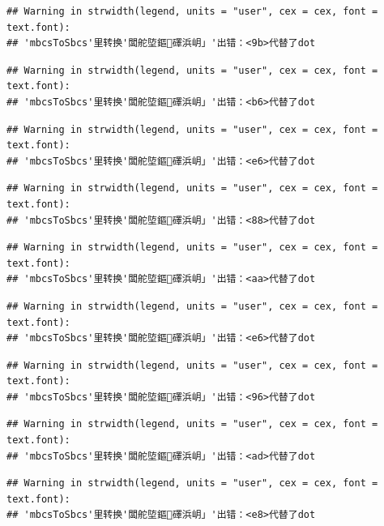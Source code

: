 \documentclass[
]{book}
\begin{document}
\begin{verbatim}
## Warning in strwidth(legend, units = "user", cex = cex, font = text.font):
## 'mbcsToSbcs'里转换'闆舵埅鏂礋浜岄」'出错：<9b>代替了dot
\end{verbatim}

\begin{verbatim}
## Warning in strwidth(legend, units = "user", cex = cex, font = text.font):
## 'mbcsToSbcs'里转换'闆舵埅鏂礋浜岄」'出错：<b6>代替了dot
\end{verbatim}

\begin{verbatim}
## Warning in strwidth(legend, units = "user", cex = cex, font = text.font):
## 'mbcsToSbcs'里转换'闆舵埅鏂礋浜岄」'出错：<e6>代替了dot
\end{verbatim}

\begin{verbatim}
## Warning in strwidth(legend, units = "user", cex = cex, font = text.font):
## 'mbcsToSbcs'里转换'闆舵埅鏂礋浜岄」'出错：<88>代替了dot
\end{verbatim}

\begin{verbatim}
## Warning in strwidth(legend, units = "user", cex = cex, font = text.font):
## 'mbcsToSbcs'里转换'闆舵埅鏂礋浜岄」'出错：<aa>代替了dot
\end{verbatim}

\begin{verbatim}
## Warning in strwidth(legend, units = "user", cex = cex, font = text.font):
## 'mbcsToSbcs'里转换'闆舵埅鏂礋浜岄」'出错：<e6>代替了dot
\end{verbatim}

\begin{verbatim}
## Warning in strwidth(legend, units = "user", cex = cex, font = text.font):
## 'mbcsToSbcs'里转换'闆舵埅鏂礋浜岄」'出错：<96>代替了dot
\end{verbatim}

\begin{verbatim}
## Warning in strwidth(legend, units = "user", cex = cex, font = text.font):
## 'mbcsToSbcs'里转换'闆舵埅鏂礋浜岄」'出错：<ad>代替了dot
\end{verbatim}

\begin{verbatim}
## Warning in strwidth(legend, units = "user", cex = cex, font = text.font):
## 'mbcsToSbcs'里转换'闆舵埅鏂礋浜岄」'出错：<e8>代替了dot
\end{verbatim}
\end{document}
